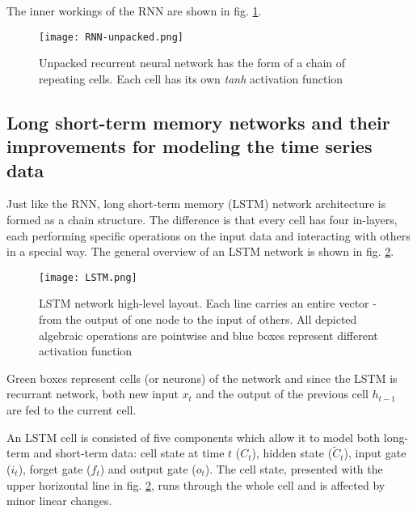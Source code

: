 The inner workings of the RNN are shown in fig. \ref{fig:rnn-unpacked}.
\begin{figure}[h]
    \centering
    \texttt{[image: RNN-unpacked.png]}
    \caption{Unpacked recurrent neural network has the form of a chain of repeating cells. Each cell has its own \textit{tanh} activation function}
    \label{fig:rnn-unpacked}
\end{figure}

\subsection{Long short-term memory networks and their improvements for modeling the time series data}
Just like the RNN, long short-term memory (LSTM) network architecture is formed as a chain structure. 
The difference is that every cell has four in-layers, each performing specific operations on the input data and interacting with others in a special way. The general overview of an LSTM network is shown in fig. \ref{fig:lstm}.
\begin{figure}[h]
    \centering
    \texttt{[image: LSTM.png]}
    \caption{LSTM network high-level layout. Each line carries an entire vector - from the output of one node to the input of others. All depicted algebraic operations are pointwise and blue boxes represent different activation function}
    \label{fig:lstm}
\end{figure}
Green boxes represent cells (or neurons) of the network and since the LSTM is recurrant network, both new input $x_{t}$ and the output of the previous cell $h_{t-1}$ are fed to the current cell.

An LSTM cell is consisted of five components which allow it to model both long-term and short-term data: cell state at time $t$ ($C_{t}$), hidden state ($\tilde{C}_{t}$), input gate ($i_{t}$), forget gate ($f_{t}$) and output gate ($o_{t}$).
The cell state, presented with the upper horizontal line in fig. \ref{fig:lstm},  runs through the whole cell and is affected by minor linear changes. 

